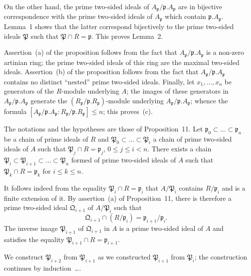 On the other hand, the prime two-sided ideals of
$A_{\mathfrak{p}}/\mathfrak{p}.A_{\mathfrak{p}}$ are in bijective
correspondence with the prime two-sided ideals of $A_{\mathfrak{p}}$
which contain $\mathfrak{p}.A_{\mathfrak{p}}$. Lemma~1 shows that the
latter correspond bijectively to the prime two-sided ideals
$\mathfrak{P}$ such that $\mathfrak{P}\cap R=\mathfrak{p}$. This proves
Lemma~2.

Assertion~(a) of the proposition follows from the fact that
$A_{\mathfrak{p}}/\mathfrak{p}.A_{\mathfrak{p}}$ is a non-zero artinian
ring; the prime two-sided ideals of this ring are the maximal two-sided
ideals. Assertion~(b) of the proposition follows from the fact that
$A_{\mathfrak{p}}/\mathfrak{p}.A_{\mathfrak{p}}$ contains no distinct
``nested'' prime two-sided ideals. Finally, let $x_1,\ldots,x_n$ be
generators of the $R$-module underlying $A$; the images of these
generators in $A_{\mathfrak{p}}/\mathfrak{p}.A_{\mathfrak{p}}$
generate the $(R_{\mathfrak{p}}/\mathfrak{p}.R_{\mathfrak{p}})$-module
underlying $A_{\mathfrak{p}}/\mathfrak{p}.A_{\mathfrak{p}}$; whence the
formula
$[A_{\mathfrak{p}}/\mathfrak{p}.A_{\mathfrak{p}}:
R_{\mathfrak{p}}/\mathfrak{p}.R_{\mathfrak{p}}]\le n$; this
proves~(c).

\begin{corollary}
The notations and the hypotheses are those of Proposition~11. Let
$\mathfrak{p}_0\subset\ldots\subset\mathfrak{p}_n$ be a chain of prime
ideals of $R$ and
$\mathfrak{P}_0\subset\ldots\subset\mathfrak{P}_i$ a chain of prime
two-sided ideals of $A$ such that
$\mathfrak{P}_j\cap R=\mathfrak{p}_j$, $0\le j\le i<n$. There exists a
chain
$\mathfrak{P}_i\subset\mathfrak{P}_{i+1}\subset\ldots\subset
\mathfrak{P}_n$ formed of prime two-sided ideals of $A$ such that
$\mathfrak{P}_k\cap R=\mathfrak{p}_k$ for $i\le k\le n$.
\end{corollary}

It follows indeed from the equality
$\mathfrak{P}_i\cap R=\mathfrak{p}_i$ that $A/\mathfrak{P}_i$
contains $R/\mathfrak{p}_i$ and is a finite extension of it. By
assertion~(a) of Proposition~11, there is therefore a prime two-sided
ideal $\mathfrak{Q}_{i+1}$ of $A/\mathfrak{P}_i$ such that
\[
\mathfrak{Q}_{i+1}\cap(R/\mathfrak{p}_i)=
\mathfrak{p}_{i+1}/\mathfrak{p}_i.
\]
The inverse image $\mathfrak{P}_{i+1}$ of $\mathfrak{Q}_{i+1}$ in $A$
is a prime two-sided ideal of $A$ and satisfies the equality
$\mathfrak{P}_{i+1}\cap R=\mathfrak{p}_{i+1}$.

We construct $\mathfrak{P}_{i+2}$ from $\mathfrak{P}_{i+1}$ as we
constructed $\mathfrak{P}_{i+1}$ from $\mathfrak{P}_i$; the
construction continues by induction~\ldots.

